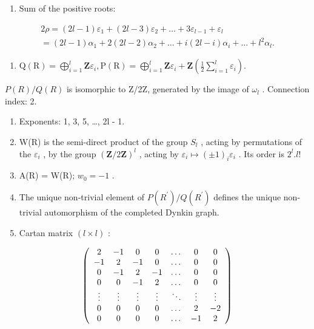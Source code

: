 \begin{enumerate}
\def\labelenumi{(\Roman{enumi})}
\setcounter{enumi}{6}
\tightlist
\item
  Sum of the positive roots:
\end{enumerate}

\[
\begin{array}{l} 2 \rho = (2 l - 1) \varepsilon_ {1} + (2 l - 3) \varepsilon_ {2} + \dots + 3 \varepsilon_ {l - 1} + \varepsilon_ {l} \\ = (2 l - 1) \alpha_ {1} + 2 (2 l - 2) \alpha_ {2} + \dots + i (2 l - i) \alpha_ {i} + \dots + l ^ {2} \alpha_ {l}. \end{array}
\]

\begin{enumerate}
\def\labelenumi{(\Roman{enumi})}
\setcounter{enumi}{7}
\tightlist
\item
  \(\mathrm{Q}(\mathrm{R}) = \bigoplus_{i=1}^{l}\mathbf{Z}\varepsilon_i,\mathrm{P}(\mathrm{R}) = \bigoplus_{i=1}^{l}\mathbf{Z}\varepsilon_i + \mathbf{Z}(\frac{1}{2}\sum_{i=1}^{l}\varepsilon_i).\)
\end{enumerate}

\(P(R)/Q(R)\) is isomorphic to Z/2Z, generated by the image of \(\omega_{l}\) . Connection index: 2.

\begin{enumerate}
\def\labelenumi{(\Roman{enumi})}
\setcounter{enumi}{8}
\item
  Exponents: 1, 3, 5, \ldots, 2l - 1.
\item
  W(R) is the semi-direct product of the group \(S_{l}\) , acting by permutations of the \(\varepsilon_{i}\) , by the group \((\mathbf{Z}/2\mathbf{Z})^{l}\) , acting by \(\varepsilon_{i} \mapsto (\pm1)_{i}\varepsilon_{i}\) . Its order is \(2^{l}.l!\)
\item
  A(R) = W(R); \(w_{0} = -1\) .
\item
  The unique non-trivial element of \(P(R^{\prime})/Q(R^{\prime})\) defines the unique non-trivial automorphism of the completed Dynkin graph.
\item
  Cartan matrix \((l \times l)\) :
\end{enumerate}

\[
\left( \begin{array}{c c c c c c c} 2 & - 1 & 0 & 0 & \dots & 0 & 0 \\ - 1 & 2 & - 1 & 0 & \dots & 0 & 0 \\ 0 & - 1 & 2 & - 1 & \dots & 0 & 0 \\ 0 & 0 & - 1 & 2 & \dots & 0 & 0 \\ \vdots & \vdots & \vdots & \vdots & \ddots & \vdots & \vdots \\ 0 & 0 & 0 & 0 & \dots & 2 & - 2 \\ 0 & 0 & 0 & 0 & \dots & - 1 & 2 \end{array} \right)
\]

